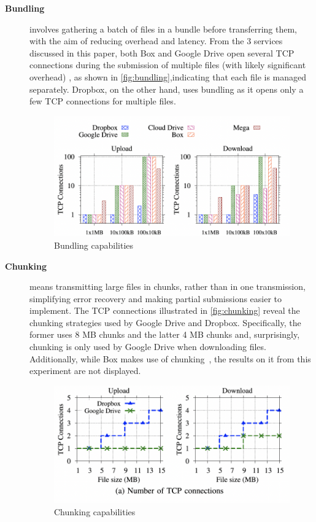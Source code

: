 \begin{description}
    \item[\textbf{Bundling}] involves gathering a batch of files in a bundle before transferring them, with the aim of reducing overhead and latency. From the 3 services discussed in this paper, both Box and Google Drive open several TCP connections during the submission of multiple files (with likely significant overhead) , as shown in  \autoref{fig:bundling},indicating that each file is managed separately. Dropbox, on the other hand, uses bundling as it opens only a few TCP connections for multiple files.

    \begin{figure} [h]
        \centering
        \includegraphics[scale=0.7]{images/bundling}
        \caption{\label{fig:bundling}Bundling capabilities}
    \end{figure}

    \item[\textbf{Chunking}] means transmitting large files in chunks, rather than in one transmission, simplifying error recovery and making partial submissions easier to implement. The TCP connections illustrated in \autoref{fig:chunking} reveal the chunking strategies used by Google Drive and Dropbox. Specifically, the former uses 8 MB chunks and the latter 4 MB chunks and, surprisingly, chunking is only used by Google Drive when downloading files. Additionally, while Box makes use of chunking~\cite{box_chunked}, the results on it from this experiment are not displayed.

    \begin{figure} [h]
        \centering
        \includegraphics[scale=0.7]{images/chunking}
        \caption{\label{fig:chunking}Chunking capabilities}
    \end{figure}


\end{description}
